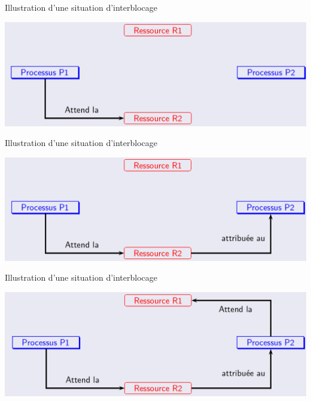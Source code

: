 \documentclass[10pt]{beamer}
\begin{document}
\begin{frame}
	\mframe{\Processus}
	\setlength{\shadowsize}{1pt}
	\begin{block}{Illustration d'une situation d'interblocage}
		\begin{center}	
			\includegraphics[scale=0.25]{../../Archi_Materielle/data/blocage_2}
		\end{center}
	\end{block}
\end{frame}

\begin{frame}
	\mframe{\Processus}
	\setlength{\shadowsize}{1pt}
	\begin{block}{Illustration d'une situation d'interblocage}
		\begin{center}	
			\includegraphics[scale=0.25]{../../Archi_Materielle/data/blocage_3}
		\end{center}
	\end{block}
\end{frame}

\begin{frame}
	\mframe{\Processus}
	\setlength{\shadowsize}{1pt}
	\begin{block}{Illustration d'une situation d'interblocage}
		\begin{center}	
			\includegraphics[scale=0.25]{../../Archi_Materielle/data/blocage_4}
		\end{center}
	\end{block}
\end{frame}
\end{document}
